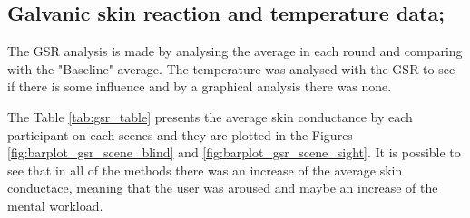 
\subsection{Galvanic skin reaction and temperature data;}
\label{subsec:results_gsr_temp}

The GSR analysis is made by analysing the average in each round and comparing with the "Baseline" average. The temperature was analysed with the GSR to see if there is some influence and by a graphical analysis there was none.

The Table \ref{tab:gsr_table} presents the average skin conductance by each participant on each scenes and they are plotted in the Figures \ref{fig:barplot_gsr_scene_blind} and \ref{fig:barplot_gsr_scene_sight}. It is possible to see that in all of the methods there was an increase of the average skin conductace, meaning that the user was aroused and maybe an increase of the mental workload.



%    
%
%        

